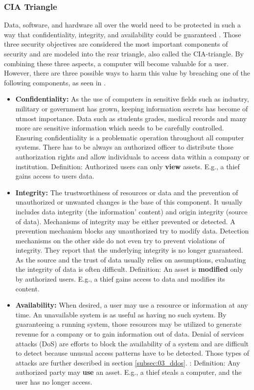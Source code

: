 \subsubsection{CIA Triangle}
Data, software, and hardware all over the world need to be protected in such a way that confidentiality, integrity, and availability could be guaranteed \cite{Pfleeger2014}. Those three security objectives are considered the most important components of security and are modeled into the rear triangle, also called the CIA-triangle. By combining these three aspects, a computer will become valuable for a user. However, there are three possible ways to harm this value by breaching one of the following components, as seen in \cite{Bishop2004}.
\begin{itemize}
    \item \textbf{Confidentiality:} As the use of computers in sensitive fields such as industry, military or government has grown, keeping information secrets has become of utmost importance. Data such as students grades, medical records and many more are sensitive information which needs to be carefully controlled. Ensuring confidentiality is a problematic operation throughout all computer systems. There has to be always an authorized officer to distribute those authorization rights and allow individuals to access data within a company or institution.
      \subitem Definition: Authorized users can only \textbf{view} assets. E.g., a thief gains access to users data.
    \item \textbf{Integrity:} The trustworthiness of resources or data and the prevention of unauthorized or unwanted changes is the base of this component. It usually includes data integrity (the information' content) and origin integrity (source of data). Mechanisms of integrity may be either prevented or detected. A prevention mechanism blocks any unauthorized try to modify data. Detection mechanisms on the other side do not even try to prevent violations of integrity. They report that the underlying integrity is no longer guaranteed. As the source and the trust of data usually relies on assumptions, evaluating the integrity of data is often difficult.
        \subitem Definition: An asset is \textbf{modified} only by authorized users. E.g., a thief gains access to data and modifies its content.
    \item \textbf{Availability:} When desired, a user may use a resource or information at any time. An unavailable system is as useful as having no such system. By guaranteeing a running system, those resources may be utilized to generate revenue for a company or to gain information out of data. Denial of services attacks (DoS) are efforts to block the availability of a system and are difficult to detect because unusual access patterns have to be detected. Those types of attacks are further described in section \ref{subsec:03_ddos}.
      \subitem:  Definition: Any authorized party may \textbf{use} an asset. E.g., a thief steals a computer, and the user has no longer access.
\end{itemize}


